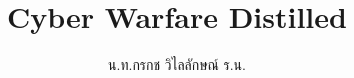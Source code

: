 \documentclass[14pt,extrafontsizes]{extbook}
\title{Cyber Warfare Distilled}
\author{น.ท.กรกช  วิไลลักษณ์ ร.น.}
\date{}                                           %
\begin{document}
\maketitle
\tableofcontents


























%



\XeTeX


\nocite{Libicki2009,Tobergte2013,Friedman2014,Andress2014,Subrahmanian2015}




\end{document}
